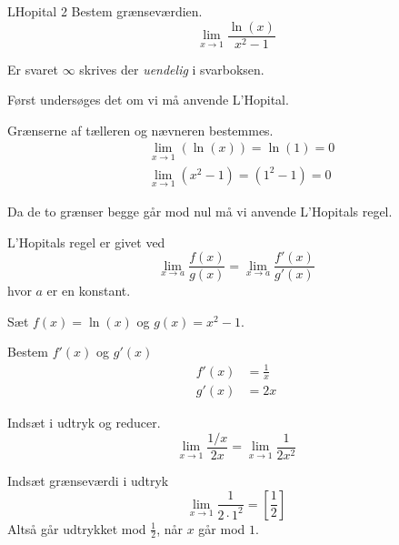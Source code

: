 \documentclass{article}
\begin{document}
\begin{exercise}{LHopital 2}
Bestem grænseværdien.
\[
\lim_{x \to 1} \frac{\ln(x)}{x^2 - 1}
\] 
	
Er svaret $\infty$ skrives der \emph{uendelig} i svarboksen.
	

\hint
Først undersøges det om vi må anvende L'Hopital.

\hint
Grænserne af tælleren og nævneren bestemmes.
\begin{align*}
	&\lim_{x \to 1} (\ln(x)) = \ln(1) = 0 \\
	&\lim_{x \to 1} (x^2 - 1) = (1^2 - 1) = 0
\end{align*}

\hint
Da de to grænser begge går mod nul må vi  anvende L'Hopitals regel. 

\hint
L'Hopitals regel er givet ved
\[
\lim_{x \to a} \frac{f(x)}{g(x)} = \lim_{x \to a} \frac{f'(x)}{g'(x)} 
\]
hvor $a$  er en konstant.

\hint
Sæt $f(x) = \ln(x)$ og $g(x) = x^2-1$. 

\hint
Bestem $f'(x)$ og $g'(x)$
\begin{align*}
	f'(x) &= \frac{1}{x} \\
	g'(x) &= 2x
\end{align*}

\hint
Indsæt i udtryk og reducer. 
\[
\lim_{x \to 1} \frac{1/x}{2x} = \lim_{x \to 1} \frac{1}{2x^2} 
\]

\hint
Indsæt grænseværdi i udtryk
\[
\lim_{x \to 1} \frac{1}{2 \cdot 1^2}  = \left[ \frac{1}{2}  \right] 
\]
Altså går udtrykket mod $\frac{1}{2}$, når $x$ går mod $1$. 
		
\end{exercise}
\end{document}
